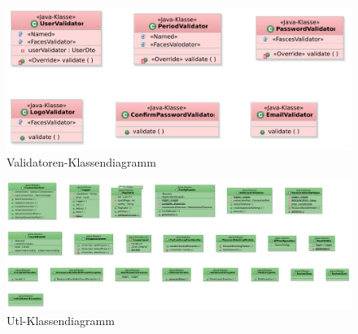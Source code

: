 \documentclass{article}
\begin{document}
\begin{figure}[H]
    \includegraphics[scale=0.4]{Validatorendiagramm.pdf}
    \caption{Validatoren-Klassendiagramm}
    \label{fig:UML-Klassendkígrramm}
\end{figure}

\begin{figure}[H]
    \includegraphics[scale=0.3]{Utildiagramm.pdf}
    \caption{Utl-Klassendiagramm}
    \label{fig:UML-Klassendkígrramm}
\end{figure}
\end{document}

